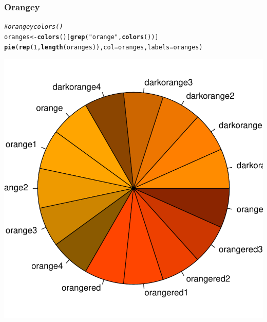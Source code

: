\documentclass[12pt]{beamer}\usepackage[]{graphicx}\usepackage[]{color}
\makeatletter
\newcommand{\hlnum}[1]{\textcolor[rgb]{0.686,0.059,0.569}{#1}}%
\newcommand{\hlstr}[1]{\textcolor[rgb]{0.192,0.494,0.8}{#1}}%
\newcommand{\hlcom}[1]{\textcolor[rgb]{0.678,0.584,0.686}{\textit{#1}}}%
\newcommand{\hlstd}[1]{\textcolor[rgb]{0.345,0.345,0.345}{#1}}%
\newcommand{\hlkwb}[1]{\textcolor[rgb]{0.69,0.353,0.396}{#1}}%
\newcommand{\hlkwc}[1]{\textcolor[rgb]{0.333,0.667,0.333}{#1}}%
\newcommand{\hlkwd}[1]{\textcolor[rgb]{0.737,0.353,0.396}{\textbf{#1}}}%
\newenvironment{kframe}{%
 \def\at@end@of@kframe{}%
 \ifinner\ifhmode%
  \def\at@end@of@kframe{\end{minipage}}%
  \begin{minipage}{\columnwidth}%
 \fi\fi%
 \def\FrameCommand##1{\hskip\@totalleftmargin \hskip-\fboxsep
 \colorbox{shadecolor}{##1}\hskip-\fboxsep
     \hskip-\linewidth \hskip-\@totalleftmargin \hskip\columnwidth}%
 \MakeFramed {\advance\hsize-\width
   \@totalleftmargin\z@ \linewidth\hsize
   \@setminipage}}%
 {\par\unskip\endMakeFramed%
 \at@end@of@kframe}
\newenvironment{knitrout}{}{} %
\makeatother
\begin{document}

\begin{frame}[fragile]
\frametitle{Orangey }

\begin{knitrout}\scriptsize
{}\color{fgcolor}\begin{kframe}
\begin{alltt}
\hlcom{# orangey colors()}
\hlstd{oranges} \hlkwb{<-} \hlkwd{colors}\hlstd{()[}\hlkwd{grep}\hlstd{(}\hlstr{"orange"}\hlstd{,} \hlkwd{colors}\hlstd{())]}
\hlkwd{pie}\hlstd{(}\hlkwd{rep}\hlstd{(}\hlnum{1}\hlstd{,} \hlkwd{length}\hlstd{(oranges)),} \hlkwc{col} \hlstd{= oranges,} \hlkwc{labels} \hlstd{= oranges)}
\end{alltt}
\end{kframe}

{\centering \includegraphics[width=.4\linewidth,height=.4\linewidth]{figure/unnamed-chunk-2-1} 

}



\end{knitrout}

\end{frame}




\end{document}
